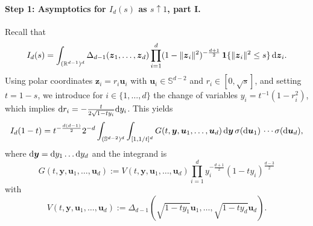 \documentclass[11pt,a4paper]{article}
\theoremstyle{plain}
\theoremstyle{definition}
\theoremstyle{remark}
\newcommand{\dint}{\textup{d}}
\newcommand{\by}{\boldsymbol{y}}
\newcommand{\bz}{\boldsymbol{z}}
\newcommand{\bu}{\boldsymbol{u}}
\def\RR{\mathbb{R}}
\def\SS{\mathbb{S}}
\begin{document}
\paragraph{Step 1: Asymptotics for $I_d(s)$ as $s\uparrow 1$, part I.}
Recall that
\[
	I_d(s)
	=\int_{(\RR^{d-1})^d}
	\Delta_{d-1}(\bz_1,\ldots,\bz_d)
	\prod_{i=1}^d(1-\|\bz_i\|^2)^{-\frac{d+1}{2}}
	\,{\bf 1}\{\|\bz_i\|^2\le s\}
	\,\dint\bz_i.
\]
Using polar coordinates $\bz_i=r_i \bu_i$ with $\bu_i\in \SS^{d-2}$ and $r_i\in[0,\sqrt{s}]$, and setting $t=1-s$, we introduce for $i\in\{1,\ldots,d\}$ the change of variables $y_i = t^{-1} (1-r_i^2)$, which implies $\dint r_i=-\frac{t}{2\sqrt{1-ty_i}}\dint y_i$. This yields
\begin{equation*}
	I_d(1-t)
	=t^{-\frac{d(d-1)}{2}}2^{-d}
	\int_{(\SS^{d-2})^d}\int_{[1,1/t]^d}
	G(t,\by,\bu_1,\ldots,\bu_d)\,
	\dint \by\, \sigma(\dint \bu_1)\, \cdots \sigma(\dint \bu_d),
\end{equation*}
where $\dint\by = \dint y_1 \dots \dint y_d$ and the integrand is
\[
	G(t,\by,\bu_1,\ldots,\bu_d):=V(t,\by,\bu_1,\ldots,\bu_d)\prod_{i=1}^d y_i^{-\frac{d+1}{2}}(1-t y_i)^{\frac{d-3}{2}}
\]
with
\[
	V(t,\by,\bu_1,\ldots,\bu_d):=\Delta_{d-1}(\sqrt{1-t y_1}\bu_1,\dots,\sqrt{1-t y_d}\bu_d).
\]
\end{document}
